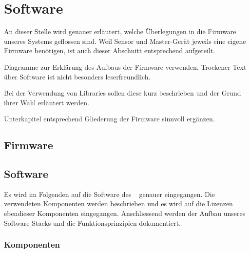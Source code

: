 \chapter{Software}
\label{chap:software}

An  dieser  Stelle wird  genauer  erl\"autert,  welche \"Uberlegungen  in  die
Firmware  unseres  Systems  geflossen  sind. Weil  Sensor  und  Master-Ger\"at
jeweils  eine   eigene  Firmware   ben\"otigen,  ist  auch   dieser  Abschnitt
entsprechend aufgeteilt.

\anweisung   Diagramme    zur   Erkl\"arung    des   Aufbaus    der   Firmware
verwenden. Trockener    Text    \"uber    Software   ist    nicht    besonders
leserfreundlich.

\anweisung Bei der Verwendung von  Libraries sollen diese kurz beschrieben und
der Grund ihrer Wahl erl\"autert werden.

\anweisung   Unterkapitel  entsprechend   Gliederung  der   Firmware  sinnvoll
erg\"anzen.


\section{Firmware \Sensor}
\label{sec:firmware:sensor}

\section{Software \Master}
\label{sec:software:master}

Es wird  im Folgenden auf  die Software des \Master~  genauer eingegangen. Die
verwendeten  Komponenten  werden beschrieben  und  es  wird auf  die  Lizenzen
ebendieser  Komponenten eingegangen. Anschliessend  werden der  Aufbau unseres
Software-Stacks und die Funktionsprinzipien dokumentiert.


\subsection{Komponenten}
\label{subsec:software:master:components}

